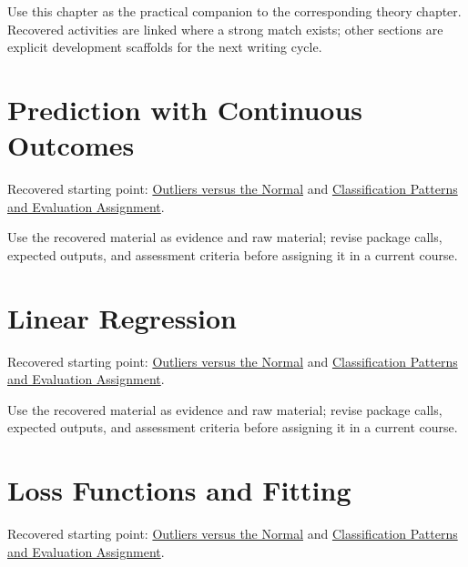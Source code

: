 \documentclass[
  letterpaper,
]{scrbook}
\begin{document}
Use this chapter as the practical companion to the corresponding theory
chapter. Recovered activities are linked where a strong match exists;
other sections are explicit development scaffolds for the next writing
cycle.

\section*{Prediction with Continuous
Outcomes}\label{sec-pr-09-prediction-with-continuous-outcomes}


Recovered starting point: \hyperref[sec-lab-outliers]{Outliers versus
the Normal} and
\hyperref[sec-lab-classification-patterns-assignment]{Classification
Patterns and Evaluation Assignment}.

Use the recovered material as evidence and raw material; revise package
calls, expected outputs, and assessment criteria before assigning it in
a current course.

\section*{Linear Regression}\label{sec-pr-09-linear-regression}


Recovered starting point: \hyperref[sec-lab-outliers]{Outliers versus
the Normal} and
\hyperref[sec-lab-classification-patterns-assignment]{Classification
Patterns and Evaluation Assignment}.

Use the recovered material as evidence and raw material; revise package
calls, expected outputs, and assessment criteria before assigning it in
a current course.

\section*{Loss Functions and
Fitting}\label{sec-pr-09-loss-functions-and-fitting}


Recovered starting point: \hyperref[sec-lab-outliers]{Outliers versus
the Normal} and
\hyperref[sec-lab-classification-patterns-assignment]{Classification
Patterns and Evaluation Assignment}.
\end{document}
